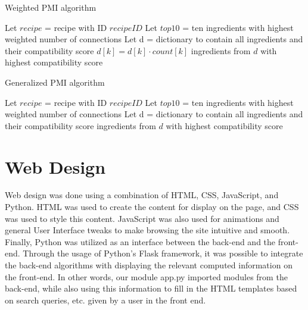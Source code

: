 \documentclass{acm_proc_article-sp}
\begin{document}
  \begin{algorithm}
   \caption{Weighted PMI algorithm}
    \begin{algorithmic}
      	\State Let $recipe$ = recipe with ID $recipeID$
        \State Let $top10$ = ten ingredients with highest weighted number of connections
        \State Let d = dictionary to contain all ingredients and their compatibility score
        		\EndFor
        	\EndIf
        \EndFor
        	$d[k] = d[k] \cdot count[k]$
        \EndFor
         ingredients from $d$ with highest compatibility score
       \EndFunction

\end{algorithmic}
\end{algorithm}

  \begin{algorithm}
   \caption{Generalized PMI algorithm}
    \begin{algorithmic}
      	\State Let $recipe$ = recipe with ID $recipeID$
        \State Let $top10$ = ten ingredients with highest weighted number of connections
        \State Let d = dictionary to contain all ingredients and their compatibility score
    		\EndFor
        \EndFor
         ingredients from $d$ with highest compatibility score
       \EndFunction

\end{algorithmic}
\end{algorithm}



\section{Web Design}

Web design was done using a combination of HTML, CSS, JavaScript, and Python. HTML was used to create the content for display on the page, and CSS was used to style this content. JavaScript was also used for animations and general User Interface tweaks to make browsing the site intuitive and smooth. Finally, Python was utilized as an interface between the back-end and the front-end. Through the usage of Python's Flask framework, it was possible to integrate the back-end algorithms with displaying the relevant computed information on the front-end. In other words, our module app.py imported modules from the back-end, while also using this information to fill in the HTML templates based on search queries, etc. given by a user in the front end. %
\end{document}
